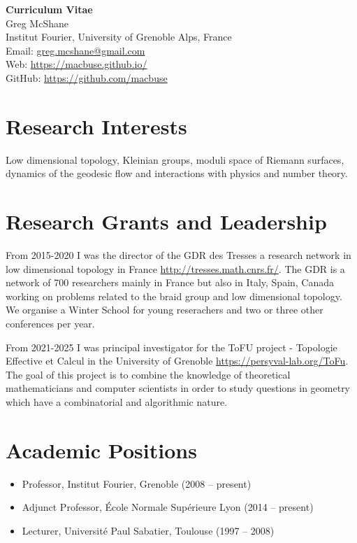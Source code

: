 \documentclass[11pt,a4paper]{article}
\begin{document}
\begin{center}
    {\Huge \textbf{Curriculum Vitae}} \\[0.5cm]
    {\Large Greg McShane} \\
    Institut Fourier, University of Grenoble Alps, France \\
    Email: \href{mailto:greg.mcshane@gmail.com}{greg.mcshane@gmail.com} \\
    Web: \url{https://macbuse.github.io/} \\
    GitHub: \url{https://github.com/macbuse} \\
\end{center}

\section*{Research Interests}
Low dimensional topology, Kleinian groups, moduli space of Riemann
surfaces, dynamics of the geodesic flow and interactions with
physics and number theory.

\section*{Research Grants and Leadership}
From 2015-2020 I was the director of the GDR des Tresses a research network in low
dimensional topology in France \url{http://tresses.math.cnrs.fr/}. The GDR is
a network of 700 researchers mainly in France but also in Italy, Spain, Canada
working on problems related to the braid group and low dimensional topology. We
organise a Winter School for young reserachers and two or three other conferences
per year.

From 2021-2025 I was  principal investigator for the ToFU project -
Topologie Effective et Calcul in the University of Grenoble
\url{https://persyval-lab.org/ToFu}. The goal of this project is to
combine the knowledge of theoretical mathematicians and computer
scientists in order to study questions in geometry which have a
combinatorial and algorithmic nature.


\section*{Academic Positions}
\begin{itemize}
    \item Professor, Institut Fourier, Grenoble (2008 -- present)
    \item Adjunct Professor, École Normale Supérieure Lyon (2014 -- present)
    \item Lecturer, Université Paul Sabatier, Toulouse (1997 -- 2008)
\end{itemize}
\end{document}
